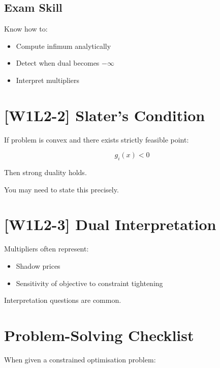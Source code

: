 \documentclass[11pt]{article}
\begin{document}
\subsection*{Exam Skill}

Know how to:

\begin{itemize}
\item Compute infimum analytically
\item Detect when dual becomes $-\infty$
\item Interpret multipliers
\end{itemize}

\newpage

\section*{[W1L2-2] Slater’s Condition}

If problem is convex and there exists strictly feasible point:

\[
g_i(x) < 0
\]

Then strong duality holds.

You may need to state this precisely.

\newpage

\section*{[W1L2-3] Dual Interpretation}

Multipliers often represent:

\begin{itemize}
\item Shadow prices
\item Sensitivity of objective to constraint tightening
\end{itemize}

Interpretation questions are common.

\newpage

\section*{Problem-Solving Checklist}

When given a constrained optimisation problem:
\end{document}
